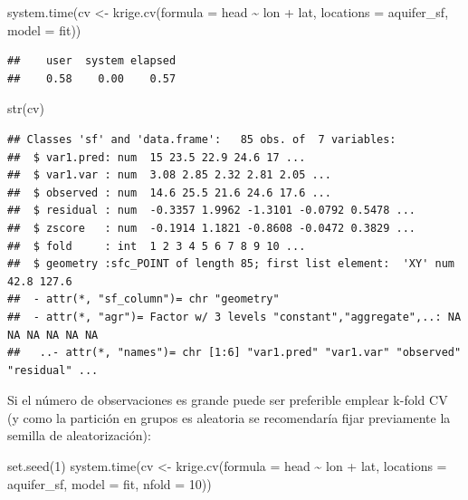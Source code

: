 \documentclass[
  spanish,
]{book}
\newenvironment{Shaded}{\begin{snugshade}}{\end{snugshade}}
\newcommand{\AttributeTok}[1]{\textcolor[rgb]{0.77,0.63,0.00}{#1}}
\newcommand{\DecValTok}[1]{\textcolor[rgb]{0.00,0.00,0.81}{#1}}
\newcommand{\FunctionTok}[1]{\textcolor[rgb]{0.00,0.00,0.00}{#1}}
\newcommand{\NormalTok}[1]{#1}
\newcommand{\OtherTok}[1]{\textcolor[rgb]{0.56,0.35,0.01}{#1}}
\newcommand{\SpecialCharTok}[1]{\textcolor[rgb]{0.00,0.00,0.00}{#1}}
\theoremstyle{break}
\theoremstyle{definition}
\theoremstyle{definition}
\theoremstyle{definition}
\theoremstyle{definition}
\theoremstyle{remark}
\begin{document}
\begin{Shaded}
\begin{Highlighting}[]
\FunctionTok{system.time}\NormalTok{(cv }\OtherTok{\textless{}{-}} \FunctionTok{krige.cv}\NormalTok{(}\AttributeTok{formula =}\NormalTok{ head }\SpecialCharTok{\textasciitilde{}}\NormalTok{ lon }\SpecialCharTok{+}\NormalTok{ lat, }\AttributeTok{locations =}\NormalTok{ aquifer\_sf,}
                           \AttributeTok{model =}\NormalTok{ fit))}
\end{Highlighting}
\end{Shaded}

\begin{verbatim}
##    user  system elapsed 
##    0.58    0.00    0.57
\end{verbatim}

\begin{Shaded}
\begin{Highlighting}[]
\FunctionTok{str}\NormalTok{(cv)}
\end{Highlighting}
\end{Shaded}

\begin{verbatim}
## Classes 'sf' and 'data.frame':   85 obs. of  7 variables:
##  $ var1.pred: num  15 23.5 22.9 24.6 17 ...
##  $ var1.var : num  3.08 2.85 2.32 2.81 2.05 ...
##  $ observed : num  14.6 25.5 21.6 24.6 17.6 ...
##  $ residual : num  -0.3357 1.9962 -1.3101 -0.0792 0.5478 ...
##  $ zscore   : num  -0.1914 1.1821 -0.8608 -0.0472 0.3829 ...
##  $ fold     : int  1 2 3 4 5 6 7 8 9 10 ...
##  $ geometry :sfc_POINT of length 85; first list element:  'XY' num  42.8 127.6
##  - attr(*, "sf_column")= chr "geometry"
##  - attr(*, "agr")= Factor w/ 3 levels "constant","aggregate",..: NA NA NA NA NA NA
##   ..- attr(*, "names")= chr [1:6] "var1.pred" "var1.var" "observed" "residual" ...
\end{verbatim}

Si el número de observaciones es grande puede ser preferible emplear k-fold CV (y como la partición en grupos es aleatoria se recomendaría fijar previamente la semilla de aleatorización):

\begin{Shaded}
\begin{Highlighting}[]
\FunctionTok{set.seed}\NormalTok{(}\DecValTok{1}\NormalTok{)}
\FunctionTok{system.time}\NormalTok{(cv }\OtherTok{\textless{}{-}} \FunctionTok{krige.cv}\NormalTok{(}\AttributeTok{formula =}\NormalTok{ head }\SpecialCharTok{\textasciitilde{}}\NormalTok{ lon }\SpecialCharTok{+}\NormalTok{ lat, }\AttributeTok{locations =}\NormalTok{ aquifer\_sf,}
                           \AttributeTok{model =}\NormalTok{ fit, }\AttributeTok{nfold =} \DecValTok{10}\NormalTok{))}
\end{Highlighting}
\end{Shaded}
\end{document}
